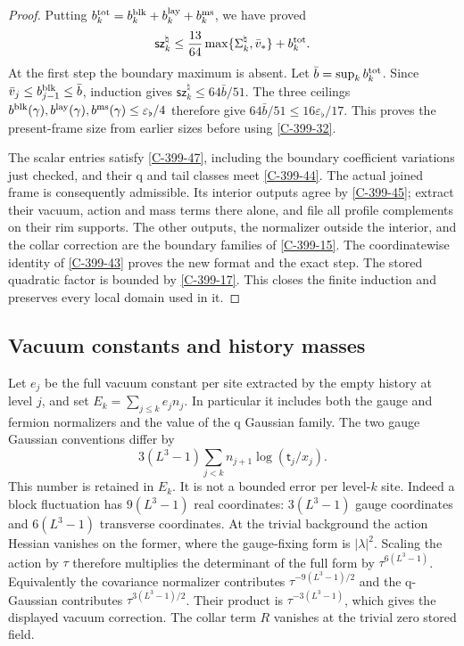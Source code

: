 \documentclass[11pt,letterpaper,reqno]{amsart}
\theoremstyle{definition}
\theoremstyle{remark}
\begin{document}
\begin{proof}
Putting $b_k^{\rm tot}=b_k^{\rm blk}+b_k^{\rm lay}
+b_k^{\rm ms}$, we have proved
\[
 \mathsf{sz}_k^\natural
 \le\frac{13}{64}\max\{\Sigma_k^\natural,\bar v_*\}
                       +b_k^{\rm tot}.
\]
At the first step the boundary maximum is absent.
Let $\bar b=\sup_k b_k^{\rm tot}$. Since
$\bar v_j\le b_{j-1}^{\rm blk}\le\bar b$,
induction gives
$\mathsf{sz}_k^\natural\le64\bar b/51$.
The three ceilings
$b^{\rm blk}(\gamma),b^{\rm lay}(\gamma),
b^{\rm ms}(\gamma)\le\varepsilon_\flat/4$
therefore give
$64\bar b/51\le16\varepsilon_\flat/17$.
This proves the present-frame size from earlier
sizes before using \cref{C-399-32}.

The scalar entries satisfy
\cref{C-399-47}, including the boundary coefficient
variations just checked, and their q and tail
classes meet \cref{C-399-44}. The actual joined
frame is consequently admissible. Its interior
outputs agree by \cref{C-399-45}; extract their
vacuum, action and mass terms there alone,
and file all profile complements on their
rim supports. The other outputs, the
normalizer outside the interior, and the
collar correction are the boundary families
of \cref{C-399-15}. The coordinatewise identity
of \cref{C-399-43} proves the new format and
the exact step. The stored quadratic factor
is bounded by \cref{C-399-17}. This closes
the finite induction and preserves every
local domain used in it.
\end{proof}

\subsection{Vacuum constants and history masses}

Let $e_j$ be the full vacuum constant per site extracted by the empty
history at level $j$, and set $E_k=\sum_{j\le k}e_jn_j$.
In particular it includes both the gauge and fermion
normalizers and the value of the q Gaussian family.
The two gauge Gaussian conventions differ by
\[
 3(L^3-1)\sum_{j<k}n_{j+1}\log(\mathsf t_j/x_j).
\]
This number is retained in $E_k$. It is not a bounded error per
level-$k$ site.
Indeed a block fluctuation has $9(L^3-1)$ real
coordinates: $3(L^3-1)$ gauge coordinates and
$6(L^3-1)$ transverse coordinates. At the trivial
background the action Hessian vanishes on the former,
where the gauge-fixing form is $|\lambda|^2$.
Scaling the action by $\tau$ therefore multiplies
the determinant of the full form by
$\tau^{6(L^3-1)}$. Equivalently the covariance
normalizer contributes $\tau^{-9(L^3-1)/2}$ and
the q-Gaussian contributes $\tau^{3(L^3-1)/2}$.
Their product is $\tau^{-3(L^3-1)}$, which gives
the displayed vacuum correction. The collar term
$R$ vanishes at the trivial zero stored field.
\end{document}
